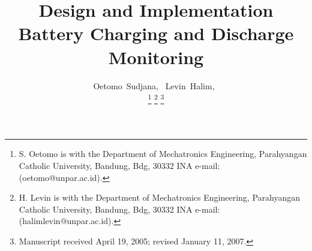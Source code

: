 \documentclass[journal]{IEEEtran}
\begin{document}
			      \title{Design and Implementation Battery Charging and Discharge Monitoring }

			      \author{Oetomo~Sudjana,~
			              Levin~Halim,~%
			              
					      \thanks{S. Oetomo is with the Department
					      of Mechatronics Engineering, Parahyangan Catholic University, Bandung,
					      Bdg, 30332 INA e-mail: (oetomo@unpar.ac.id).}%
					      \thanks{H. Levin is with the Department
					      of Mechatronics Engineering, Parahyangan Catholic University, Bandung,
					      Bdg, 30332 INA e-mail: (halimlevin@unpar.ac.id).}%
					      \thanks{Manuscript received April 19, 2005; revised January 11, 2007.}}

\end{document}
